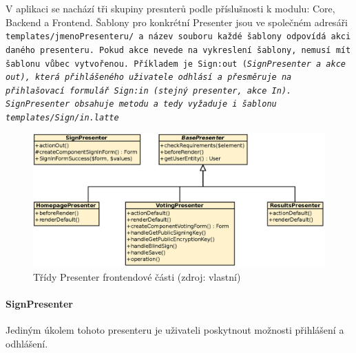 V aplikaci se nachází tři skupiny presnterů podle příslušnosti k modulu: Core, Backend a Frontend. Šablony pro konkrétní Presenter jsou ve společném adresáři \tt{templates/jmenoPresenteru/} a název souboru každé šablony odpovídá akci daného presenteru. Pokud akce nevede na vykreslení šablony, nemusí mít šablonu vůbec vytvořenou. Příkladem je \tt{Sign:out} (\it{SignPresenter} a akce \it{out}), která přihlášeného uživatele odhlásí a přesměruje na přihlašovací formulář \tt{Sign:in} (stejný presenter, akce \textit{In}). SignPresenter obsahuje metodu  a tedy vyžaduje i šablonu \tt{templates/Sign/in.latte}



\begin{figure}[h]
	\centering
	\includegraphics[width=\linewidth]{svg/frontendPresenters.eps}
	\captionsetup{width=\linewidth}
	\caption[Třídy Presenter frontendové části]{Třídy Presenter frontendové části (zdroj: vlastní)}
	\label{fig:FrontendPresenters}
\end{figure}
\clearpage
\paragraph{SignPresenter} Jediným úkolem tohoto presenteru je uživateli poskytnout možnosti přihlášení a odhlášení.

